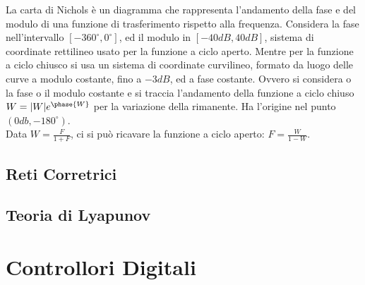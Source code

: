 \documentclass{article}
\numberwithin{equation}{subsection}
\begin{document}
La carta di Nichols è un diagramma che rappresenta l'andamento della fase e del modulo di una funzione di trasferimento rispetto alla frequenza. Considera la fase nell'intervallo 
$[-360^{\circ},0^{\circ}]$, ed il modulo in $[-40dB, 40dB]$, sistema di coordinate rettilineo usato per la funzione a ciclo aperto. Mentre per la funzione a ciclo chiusco 
si usa un sistema di coordinate curvilineo, formato da luogo delle curve a modulo costante, fino a $-3dB$, ed a fase costante. Ovvero si considera o la fase o il modulo costante e si traccia 
l'andamento della funzione a ciclo chiuso $W=|W|e^{\phase{W}}$ per la variazione della rimanente. Ha l'origine nel punto $(0db,-180^{\circ})$. \\
Data $W=\displaystyle\frac{F}{1+F}$, ci si può ricavare la funzione a ciclo aperto: $F=\displaystyle\frac{W}{1-W}$. 

\subsection{Reti Corretrici}

\subsection{Teoria di Lyapunov}

\clearpage

\section{Controllori Digitali}
\end{document}
